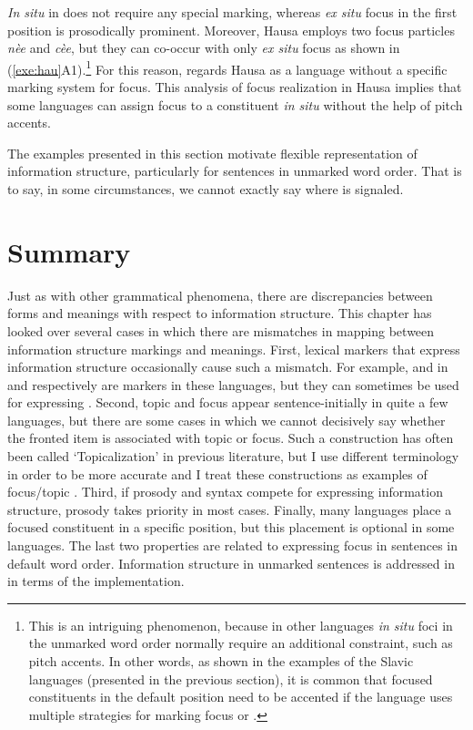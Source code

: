 \noindent \textit{In situ}  in  does not require any special
marking, whereas \textit{ex situ} focus in the first position is
prosodically prominent. Moreover, Hausa employs two focus particles
\textit{n{\`e}e} and \textit{c{\`e}e}, but they can co-occur with only
\textit{ex situ} focus as shown in (\ref{exe:hau}A1).\footnote{This is
  an intriguing phenomenon, because in other languages \textit{in
    situ} foci in the unmarked word order normally require an
  additional constraint, such as pitch accents. In other words, as
  shown in the examples of the Slavic languages (presented in the
  previous section), it is common that focused constituents in the
  default position need to be accented if the language uses multiple
  strategies for marking focus or .} For this reason,
\citet{buring:10} regards Hausa as a language without a specific
marking system for focus. This analysis of focus realization in Hausa
implies that some languages can assign focus to a constituent
\textit{in situ} without the help of pitch accents.


The examples presented in this section motivate flexible
representation of information structure, particularly for sentences in
unmarked word order.  That is to say, in some circumstances, we cannot
exactly say where  is signaled.


\section{Summary}
\label{5:sec:summary}

Just as with other grammatical phenomena, there are discrepancies
between forms and meanings with respect to information structure.
This chapter has looked over several cases in which there are
mismatches in mapping between information structure markings and
meanings. First, lexical markers that express
information structure occasionally cause such a mismatch. For example,
\wa and \nun in  and  respectively are 
markers in these languages, but they can sometimes be used for
expressing . Second, topic and focus appear
sentence-initially in quite a few languages, but there are some cases
in which we cannot decisively say whether the fronted item is
associated with topic or focus. Such a construction has often been
called `Topicalization' in previous literature, but I 
use different terminology in order to be more accurate and I treat
these constructions as examples of focus/topic . Third,
if prosody and syntax compete for expressing information structure,
prosody takes priority in most cases. Finally, many languages place a
focused constituent in a specific position, but this placement is
optional in some languages.  The last two properties are related to
expressing focus in sentences in default word order. Information
structure in unmarked sentences is addressed in  
in terms of the implementation.


